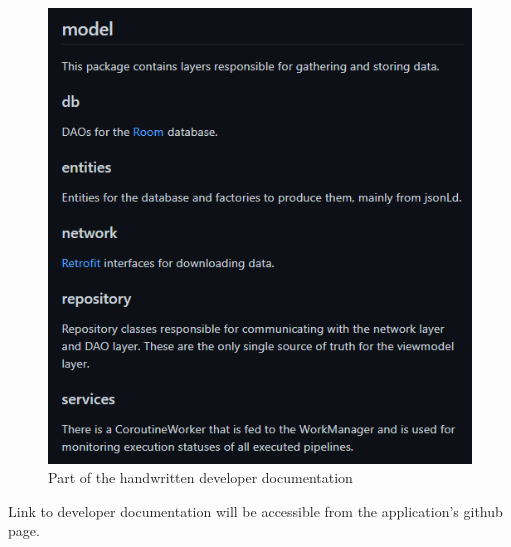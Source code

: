 \begin{figure}\centering
	\includegraphics[width=1\textwidth]{pics/developerDocumentation.png}
	\caption[Part of the handwritten developer documentation]{Part of the handwritten developer documentation}\label{fig:developerdocumentation}
\end{figure}

Link to developer documentation will be accessible from the application's github page.
